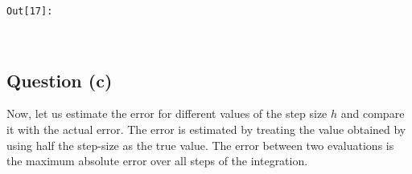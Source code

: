 \documentclass[11pt]{article}
\begin{document}
\texttt{\color{outcolor}Out[{\color{outcolor}17}]:}
    
    \begin{center}
    \end{center}
    { \hspace*{\fill} \\}
    

    \subsection{Question (c)}\label{question-c}

Now, let us estimate the error for different values of the step size
\(h\) and compare it with the actual error. The error is estimated by
treating the value obtained by using half the step-size as the true
value. The error between two evaluations is the maximum absolute error
over all steps of the integration.
\end{document}

